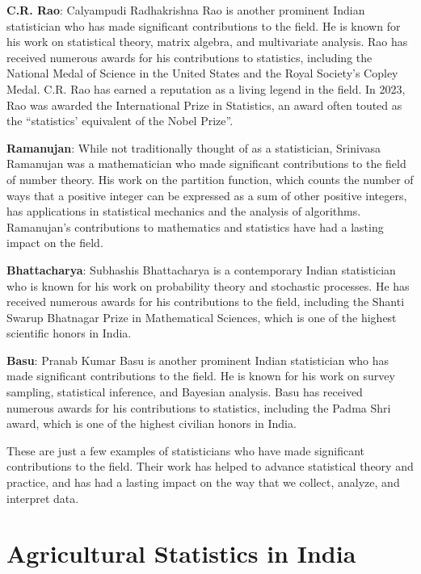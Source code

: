 \documentclass[
]{book}
\begin{document}
\textbf{C.R. Rao}: Calyampudi Radhakrishna Rao is another prominent Indian statistician who has made significant contributions to the field. He is known for his work on statistical theory, matrix algebra, and multivariate analysis. Rao has received numerous awards for his contributions to statistics, including the National Medal of Science in the United States and the Royal Society's Copley Medal. C.R. Rao has earned a reputation as a living legend in the field. In 2023, Rao was awarded the International Prize in Statistics, an award often touted as the ``statistics' equivalent of the Nobel Prize''.

\textbf{Ramanujan}: While not traditionally thought of as a statistician, Srinivasa Ramanujan was a mathematician who made significant contributions to the field of number theory. His work on the partition function, which counts the number of ways that a positive integer can be expressed as a sum of other positive integers, has applications in statistical mechanics and the analysis of algorithms. Ramanujan's contributions to mathematics and statistics have had a lasting impact on the field.

\textbf{Bhattacharya}: Subhashis Bhattacharya is a contemporary Indian statistician who is known for his work on probability theory and stochastic processes. He has received numerous awards for his contributions to the field, including the Shanti Swarup Bhatnagar Prize in Mathematical Sciences, which is one of the highest scientific honors in India.

\textbf{Basu}: Pranab Kumar Basu is another prominent Indian statistician who has made significant contributions to the field. He is known for his work on survey sampling, statistical inference, and Bayesian analysis. Basu has received numerous awards for his contributions to statistics, including the Padma Shri award, which is one of the highest civilian honors in India.

These are just a few examples of statisticians who have made significant contributions to the field. Their work has helped to advance statistical theory and practice, and has had a lasting impact on the way that we collect, analyze, and interpret data.

\hypertarget{agricultural-statistics-in-india}{%
\section{Agricultural Statistics in India}\label{agricultural-statistics-in-india}}
\end{document}
